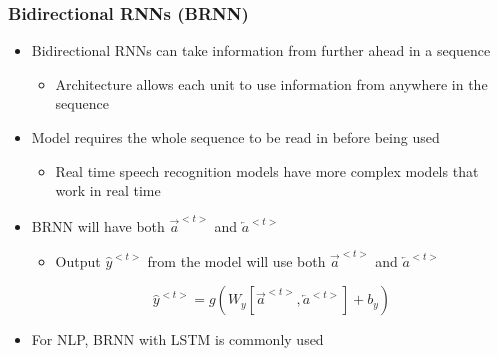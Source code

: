 \documentclass[12pt, letterpaper]{article}
\begin{document}
    \subsubsection{Bidirectional RNNs (BRNN)}
    \begin{itemize}
        \item Bidirectional RNNs can take information from further ahead in a sequence
        \begin{itemize}
            \item Architecture allows each unit to use information from anywhere in the sequence
        \end{itemize}
        \item Model requires the whole sequence to be read in before being used
        \begin{itemize}
            \item Real time speech recognition models have more complex models that work in real time
        \end{itemize}
        \item BRNN will have both $\overrightarrow{a}^{<t>}$ and $\overleftarrow{a}^{<t>}$ 
        \begin{itemize}
            \item Output $\hat{y}^{<t>}$ from the model will use both $\overrightarrow{a}^{<t>}$ and $\overleftarrow{a}^{<t>}$
        \end{itemize}
        $$\hat{y}^{<t>}=g(W_y[\overrightarrow{a}^{<t>},\overleftarrow{a}^{<t>}]+b_y)$$
        \item For NLP, BRNN with LSTM is commonly used
    \end{itemize}
\end{document}
